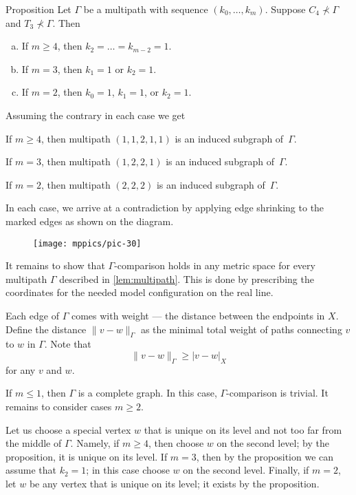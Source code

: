 \documentclass{article}
\begin{document}
\begin{thm}{Proposition}\label{lem:multipath}
Let $\Gamma$ be a multipath with sequence $(k_0,\dots, k_m)$.
Suppose $C_4\nprec\Gamma$ and  $T_3\nprec\Gamma$.
Then 
\begin{enumerate}[(a)]
 \item\label{lem:multipath:5} If $m\ge 4$, then $k_2=\dots=k_{m-2}=1$.
 \item\label{lem:multipath:4} If $m= 3$, then $k_1=1$ or $k_2=1$.
 \item\label{lem:multipath:3} If $m= 2$, then $k_0=1$, $k_1=1$, or $k_2=1$.
\end{enumerate}

\end{thm}

 Assuming the contrary in each case we get

If $m\ge 4$, then multipath $(1,1,2,1,1)$ is an induced subgraph of~$\Gamma$.

If $m=3$, then multipath $(1,2,2,1)$ is an induced subgraph of~$\Gamma$.

If $m=2$, then multipath $(2,2,2)$ is an induced subgraph of~$\Gamma$.

In each case, we arrive at a contradiction by applying edge shrinking to the marked edges as shown on the diagram.

\begin{figure}[h!]
\centering
\texttt{[image: mppics/pic-30]}
\end{figure}
\qedsf


It remains to show that $\Gamma$-comparison holds in any metric space for every multipath $\Gamma$ described in \ref{lem:multipath}.
This is done by prescribing the coordinates for the needed model configuration on the real line.

Each edge of $\Gamma$ comes with weight --- the distance between the endpoints in $X$.
Define the distance $\|v-w\|_\Gamma$ as the minimal total weight of paths connecting $v$ to $w$ in $\Gamma$.
Note that 
\[\|v-w\|_\Gamma\ge |v-w|_X\]
for any $v$ and $w$.

If $m\le 1$, then $\Gamma$ is a complete graph.
In this case, $\Gamma$-comparison is trivial.
It remains to consider cases $m\ge2$.

Let us choose a special vertex $w$ that is unique on its level and not too far from the middle of $\Gamma$.
Namely, if $m\ge 4$, then choose $w$ on the second level;
by the proposition, it is unique on its level.
If $m=3$, then by the proposition we can assume that $k_2=1$; in this case choose $w$ on the second level.
Finally, if $m=2$, let $w$ be any vertex that is unique on its level; it exists by the proposition. 
\end{document}
